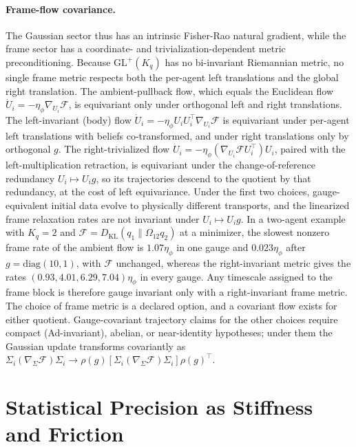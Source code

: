 \documentclass[11pt]{article}
\begin{document}
\paragraph{Frame-flow covariance.}
The Gaussian sector thus has an intrinsic Fisher-Rao natural gradient, while the frame sector has a coordinate- and trivialization-dependent metric preconditioning. Because $\mathrm{GL}^+(K_q)$ has no bi-invariant Riemannian metric, no single frame metric respects both the per-agent left translations and the global right translation. The ambient-pullback flow, which equals the Euclidean flow $\dot U_i = -\eta_\phi\nabla_{U_i}\mathcal{F}$, is equivariant only under orthogonal left and right translations. The left-invariant (body) flow $\dot U_i = -\eta_\phi U_iU_i^\top\nabla_{U_i}\mathcal{F}$ is equivariant under per-agent left translations with beliefs co-transformed, and under right translations only by orthogonal $g$. The right-trivialized flow $\dot U_i = -\eta_\phi(\nabla_{U_i}\mathcal{F}U_i^\top)U_i$, paired with the left-multiplication retraction, is equivariant under the change-of-reference redundancy $U_i\mapsto U_ig$, so its trajectories descend to the quotient by that redundancy, at the cost of left equivariance. Under the first two choices, gauge-equivalent initial data evolve to physically different transports, and the linearized frame relaxation rates are not invariant under $U_i\mapsto U_ig$. In a two-agent example with $K_q = 2$ and $\mathcal{F} = D_{\mathrm{KL}}(q_1\|\Omega_{12}q_2)$ at a minimizer, the slowest nonzero frame rate of the ambient flow is $1.07\eta_\phi$ in one gauge and $0.023\eta_\phi$ after $g = \mathrm{diag}(10, 1)$, with $\mathcal{F}$ unchanged, whereas the right-invariant metric gives the rates $(0.93, 4.01, 6.29, 7.04)\eta_\phi$ in every gauge. Any timescale assigned to the frame block is therefore gauge invariant only with a right-invariant frame metric. The choice of frame metric is a declared option, and a covariant flow exists for either quotient. Gauge-covariant trajectory claims for the other choices require compact (Ad-invariant), abelian, or near-identity hypotheses; under them the Gaussian update transforms covariantly as $\Sigma_i(\nabla_\Sigma\mathcal{F})\Sigma_i \to \rho(g)[\Sigma_i(\nabla_\Sigma\mathcal{F})\Sigma_i]\rho(g)^\top$.

\section{Statistical Precision as Stiffness and Friction}\label{sec:mass}
\end{document}
